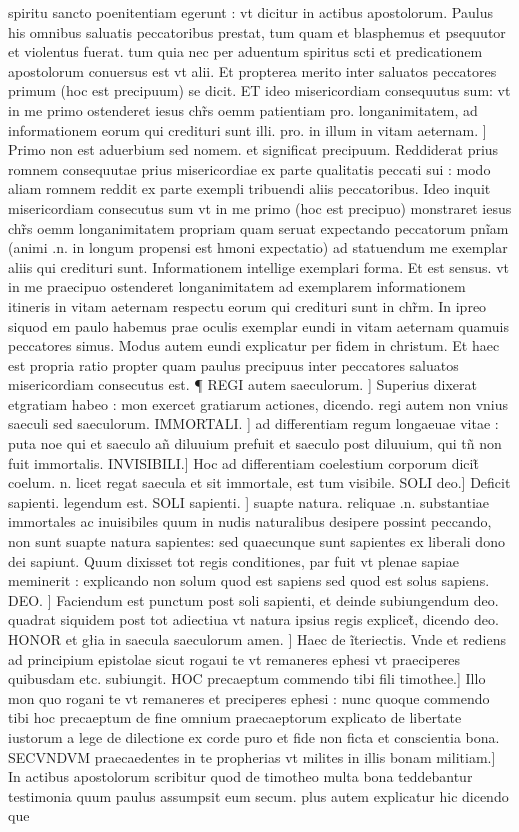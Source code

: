 \documentclass{article}
\begin{document}
\begin{pages}
spiritu sancto poenitentiam egerunt : vt dicitur in actibus apostolorum. Paulus his omnibus saluatis peccatoribus prestat, tum quam et blasphemus et psequutor et violentus fuerat. tum quia nec per aduentum spiritus scti et predicationem apostolorum conuersus est vt alii. Et propterea merito inter saluatos peccatores primum (hoc est precipuum) se dicit. ET ideo misericordiam consequutus sum: vt in me primo ostenderet iesus chr̃s oemm patientiam pro. longanimitatem, ad informationem eorum qui credituri sunt illi. pro. in illum  in vitam aeternam. ] Primo non est aduerbium sed nomem. et significat precipuum. Reddiderat prius romnem consequutae prius misericordiae ex parte qualitatis peccati sui : modo aliam romnem reddit ex parte exempli tribuendi aliis peccatoribus. Ideo inquit misericordiam consecutus sum vt in me primo (hoc est precipuo) monstraret iesus chr̃s oemm longanimitatem propriam quam seruat expectando peccatorum pnĩam (animi .n. in longum propensi est hmoni expectatio) ad statuendum me exemplar aliis qui credituri sunt. Informationem intellige exemplari forma. Et est sensus. vt in me praecipuo ostenderet longanimitatem ad exemplarem informationem itineris in vitam aeternam respectu eorum qui credituri sunt in chr̃m. In ipreo siquod em paulo habemus prae oculis exemplar eundi in vitam aeternam  quamuis peccatores simus. Modus autem eundi explicatur per fidem in christum. Et haec est propria ratio propter quam paulus precipuus inter peccatores saluatos misericordiam consecutus est. ¶ REGI autem saeculorum. ] Superius dixerat   etgratiam habeo : mon exercet gratiarum actiones, dicendo. regi autem non vnius saeculi sed saeculorum. IMMORTALI. ] ad differentiam regum longaeuae vitae : puta noe qui et saeculo añ diluuium prefuit et saeculo post diluuium, qui tñ non fuit immortalis. INVISIBILI.] Hoc ad differentiam coelestium corporum dicit̃ coelum. n. licet regat saecula et sit immortale, est tum visibile. SOLI deo.] Deficit sapienti. legendum est. SOLI sapienti. ] suapte natura. reliquae .n. substantiae immortales ac inuisibiles quum in nudis naturalibus desipere possint peccando, non sunt suapte natura sapientes: sed quaecunque  sunt sapientes  ex liberali dono dei sapiunt. Quum dixisset tot regis conditiones, par fuit vt plenae sapiae meminerit : explicando non solum quod est sapiens  sed quod est solus sapiens. DEO. ] Faciendum est punctum post soli sapienti, et deinde subiungendum deo. quadrat siquidem post tot adiectiua vt natura ipsius regis explicet̃, dicendo deo. HONOR et głia in saecula saeculorum amen. ] Haec de ĩteriectis. Vnde et rediens ad principium epistolae sicut rogaui te vt remaneres ephesi vt praeciperes quibusdam etc.  subiungit. HOC precaeptum commendo tibi fili timothee.] Illo mon quo rogani te vt remaneres et preciperes ephesi : nunc quoque  commendo tibi hoc precaeptum de fine omnium praecaeptorum explicato  de libertate iustorum a lege de dilectione ex corde puro et fide non ficta et conscientia bona. SECVNDVM praecaedentes in te propherias vt milites in illis bonam militiam.] In actibus apostolorum scribitur quod de timotheo multa bona  \pend\pstart teddebantur testimonia  quum paulus assumpsit eum secum. plus autem explicatur hic  dicendo que   \pend

\end{pages}
\end{document}
